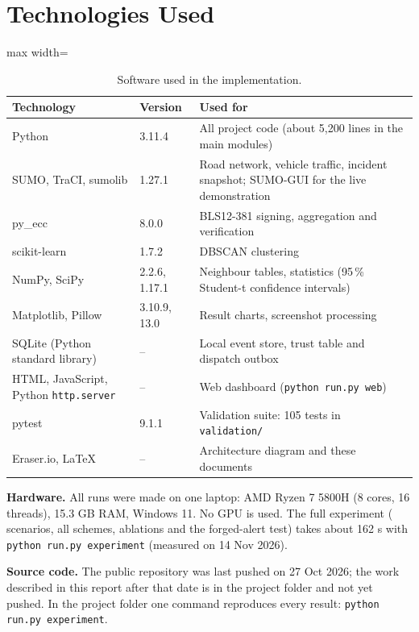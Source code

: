 \documentclass[11pt, a4paper]{article}
\begin{document}
\section{Technologies Used}
\begin{table}[htbp]
\centering
\footnotesize
\renewcommand{\arraystretch}{1.2}
\begin{adjustbox}{max width=\textwidth}
\begin{tabular}{|p{3.6cm}|p{2.0cm}|p{9.6cm}|}
\hline
\textbf{Technology} & \textbf{Version} & \textbf{Used for} \\
\hline
Python & 3.11.4 & All project code (about 5{,}200 lines in the main modules) \\
SUMO, TraCI, sumolib \cite{lopez2018sumo} & 1.27.1 & Road network, vehicle traffic, incident snapshot; SUMO-GUI for the live demonstration \\
py\_ecc & 8.0.0 & BLS12-381 signing, aggregation and verification \cite{boneh2004short} \\
scikit-learn & 1.7.2 & DBSCAN clustering \cite{ester1996dbscan} \\
NumPy, SciPy & 2.2.6, 1.17.1 & Neighbour tables, statistics (95\,\% Student-t confidence intervals) \\
Matplotlib, Pillow & 3.10.9, 13.0 & Result charts, screenshot processing \\
SQLite (Python standard library) & -- & Local event store, trust table and dispatch outbox \\
HTML, JavaScript, Python \texttt{http.server} & -- & Web dashboard (\texttt{python run.py web}) \\
pytest & 9.1.1 & Validation suite: 105 tests in \texttt{validation/} \\
Eraser.io, \LaTeX{} & -- & Architecture diagram and these documents \\
\hline
\end{tabular}
\end{adjustbox}
\caption{Software used in the implementation.}
\end{table}

\noindent\textbf{Hardware.} All runs were made on one laptop: AMD Ryzen 7 5800H (8 cores, 16 threads), 15.3 GB RAM,
Windows 11. No GPU is used. The full experiment (\NScenarios{} scenarios, all schemes, ablations and the forged-alert
test) takes about 162 s with \texttt{python run.py experiment} (measured on 14 Nov 2026).

\noindent\textbf{Source code.} The public repository \texttt{\RepoURL} was last pushed on 27 Oct 2026; the work
described in this report after that date is in the project folder and not yet pushed. In the project folder one command
reproduces every result: \texttt{python run.py experiment}.
\end{document}
